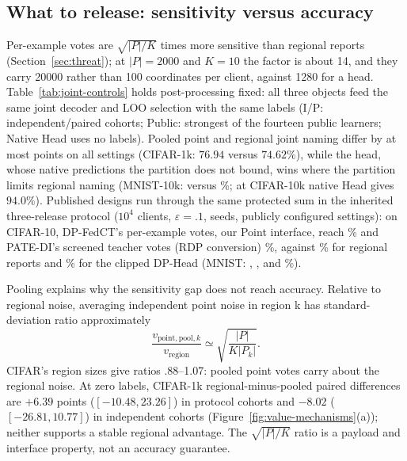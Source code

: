 \subsection{What to release: sensitivity versus accuracy}
\label{sec:eval:rounds}

Per-example votes are $\sqrt{|P|/K}$ times more sensitive than regional
reports (Section~\ref{sec:threat}); at $|P|=2000$ and $K=10$ the factor is
about 14, and they carry 20000 rather than 100 coordinates per client,
against 1280 for a head. Table~\ref{tab:joint-controls} holds
post-processing fixed: all three objects feed the same joint decoder and LOO
selection with the same labels (I/P: independent/paired cohorts; Public:
strongest of the fourteen public learners; Native Head uses no labels). Pooled point and regional joint naming differ
by at most \PointRegionMaxGap{} points on all \PointRegionSettings{} settings
(CIFAR-1k: $76.94$ versus $74.62\%$), while the head, whose native
predictions the partition does not bound, wins where the partition limits
regional naming (MNIST-10k: \HeadMnistTenK{} versus \RegionMnistTenK{}\%; at
CIFAR-10k native Head gives $94.0\%$). Published designs run through the same
protected sum in the inherited three-release protocol ($10^4$ clients,
$\varepsilon=.1$, \ExtSeeds{} seeds, publicly configured settings): on
CIFAR-10, DP-FedCT's per-example votes, our Point interface, reach
\ExtFedCTCifar{}\% and PATE-DI's screened teacher votes (RDP conversion)
\ExtPATECifar{}\%, against \ExtSDDCifar{}\% for regional reports and
\ExtHeadCifar{}\% for the clipped DP-Head (MNIST: \ExtFedCTMnist{},
\ExtPATEMnist{}, \ExtSDDMnist{} and \ExtHeadMnist{}\%).

Pooling explains why the sensitivity gap does not reach accuracy. Relative
to regional noise, averaging independent point noise in
region k has standard-deviation ratio approximately
\begin{equation}
\frac{v_{\mathrm{point,pool},k}}{v_{\mathrm{region}}}
\simeq\sqrt{\frac{|P|}{K |P_k|}}.
\label{eq:pooling-ratio}
\end{equation}
CIFAR's region sizes give ratios .88--1.07: pooled point votes carry about the
regional noise. At zero labels, CIFAR-1k regional-minus-pooled paired
differences are $+6.39$ points ($[-10.48,23.26]$) in protocol cohorts and
$-8.02$ ($[-26.81,10.77]$) in independent cohorts
(Figure~\ref{fig:value-mechanisms}(a)); neither supports a stable regional
advantage. The $\sqrt{|P|/K}$ ratio is a payload and interface property, not
an accuracy guarantee.

